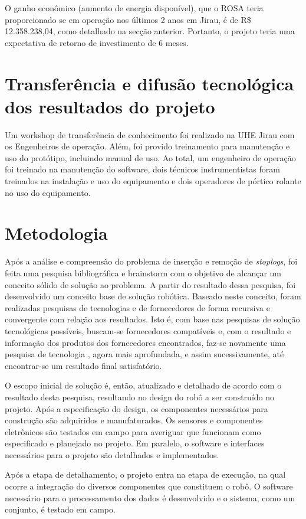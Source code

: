 O ganho econômico (aumento de energia disponível), que o ROSA teria
proporcionado se em operação nos últimos 2 anos em Jirau, é de R\$
12.358.238,04, como detalhado na secção anterior. Portanto, o projeto teria uma
expectativa de retorno de investimento de 6 meses.

\section{Transferência e difusão tecnológica dos resultados do projeto}
Um workshop de transferência de conhecimento foi realizado na UHE Jirau com os
Engenheiros de operação. Além, foi provido treinamento para manutenção e uso do 
protótipo, incluindo manual de uso. Ao total, um engenheiro de operação foi 
treinado na manutenção do software, dois técnicos instrumentistas foram treinados 
na instalação e uso do equipamento e dois operadores de pórtico rolante no uso 
do equipamento.

\section{Metodologia}

Após a análise e compreensão do problema de inserção e remoção de
\textit{stoplogs}, foi feita uma pesquisa bibliográfica e brainstorm com o
objetivo de alcançar um conceito sólido de solução ao problema. A partir do
resultado dessa pesquisa, foi desenvolvido um conceito base de solução robótica. 
Baseado neste conceito, foram realizadas pesquisas de tecnologias e de fornecedores 
de forma recursiva e convergente com relação aos resultados. Isto é, com base
nas pesquisas de solução tecnológicas possíveis, buscam-se fornecedores
compatíveis e, com o resultado e informação dos produtos dos fornecedores
encontrados, faz-se novamente uma pesquisa de tecnologia , agora mais
aprofundada, e assim sucessivamente, até encontrar-se um resultado final
satisfatório.

O escopo inicial de solução é, então, atualizado e detalhado de acordo com o 
resultado desta pesquisa, resultando no design do robô a ser construído no projeto. 
Após a especificação do design, os componentes necessários para construção são
adquiridos e manufaturados. Os sensores e componentes eletrônicos são testados
em campo para averiguar que funcionam como especificado e planejado no
projeto. Em paralelo, o software e interfaces necessários para o projeto são 
detalhados e implementados. 

Após a etapa de detalhamento, o projeto entra na etapa de execução, na qual
ocorre a integração do diversos componentes que constituem o robô.
O software necessário para o processamento dos dados é desenvolvido e o
sistema, como um conjunto, é testado em campo. 

